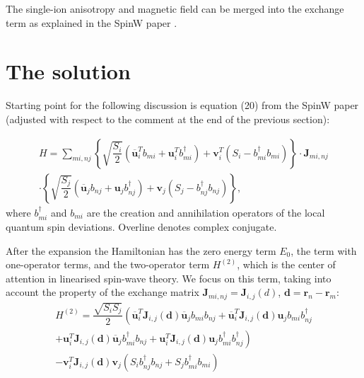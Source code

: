 \documentclass[a4paper,12pt]{article}
\begin{document}
        The single-ion anisotropy and magnetic field can be merged into the exchange term as explained in the SpinW paper \cite{toth2015linear}.

    \section{The solution}

        Starting point for the following discussion is equation (20) from the SpinW paper \cite{toth2015linear} 
        (adjusted with respect to the comment at the end of the previous section):

        \begin{multline}
            H = \sum_{mi, nj}\left\{\sqrt{\dfrac{S_{i}}{2}}\left(\overline{\boldsymbol{u}}^T_i b_{mi} + \boldsymbol{u}^T_i b^{\dag}_{mi} \right) + 
            \boldsymbol{v}^T_i(S_i - b^{\dag}_{mi}b_{mi})\right\}  \cdot
            \boldsymbol{J}_{mi, nj}\\
            \cdot\left\{\sqrt{\dfrac{S_{j}}{2}}\left(\overline{\boldsymbol{u}}_j b_{nj} + \boldsymbol{u}_j b^{\dag}_{nj} \right) + 
            \boldsymbol{v}_j(S_j - b^{\dag}_{nj}b_{nj})\right\},
        \end{multline}
        where $b^{\dag}_{mi}$ and $b_{mi}$ are the creation and annihilation operators of the local quantum spin deviations. Overline denotes complex conjugate.

        After the expansion the Hamiltonian has the zero energy term $E_0$, the term with one-operator terms, 
        and the two-operator term $H^{(2)}$, which is the center of attention in linearised spin-wave theory. 
        We focus on this term, taking into account the property of the exchange matrix $\boldsymbol{J}_{mi, nj} = \boldsymbol{J}_{i,j}(d)$, $\boldsymbol{d} = \boldsymbol{r}_n - \boldsymbol{r}_m$:
        \begin{multline}
            H^{(2)} = \dfrac{\sqrt{S_i S_j}}{2}\left(\overline{\boldsymbol{u}}^T_i\boldsymbol{J}_{i,j}(\boldsymbol{d})\overline{\boldsymbol{u}}_jb_{mi}b_{nj} +
            \overline{\boldsymbol{u}}^T_i\boldsymbol{J}_{i,j}(\boldsymbol{d})\boldsymbol{u}_j b_{mi}b^{\dag}_{nj}\right. \\+ 
            \left.\boldsymbol{u}^T_i\boldsymbol{J}_{i,j}(\boldsymbol{d})\overline{\boldsymbol{u}}_jb^{\dag}_{mi}b_{nj} +
            \boldsymbol{u}^T_i\boldsymbol{J}_{i,j}(\boldsymbol{d})\boldsymbol{u}_jb^{\dag}_{mi}b^{\dag}_{nj}\right) \\-
            \boldsymbol{v}^T_i\boldsymbol{J}_{i,j}(\boldsymbol{d})\boldsymbol{v}_j\left(S_ib^{\dag}_{nj}b_{nj} + S_jb^{\dag}_{mi}b_{mi}\right)
        \end{multline}
\end{document}
